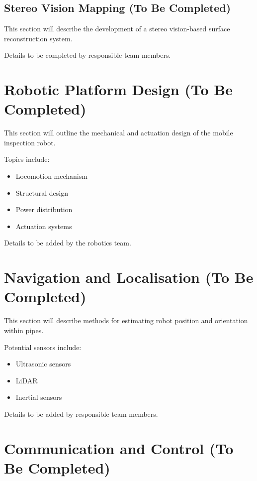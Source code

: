 \documentclass[11pt,a4paper]{article}
\begin{document}
\subsection{Stereo Vision Mapping (To Be Completed)}

This section will describe the development of a stereo vision-based surface reconstruction system.

Details to be completed by responsible team members.

\section{Robotic Platform Design (To Be Completed)}

This section will outline the mechanical and actuation design of the mobile inspection robot.

Topics include:

\begin{itemize}
  \item Locomotion mechanism
  \item Structural design
  \item Power distribution
  \item Actuation systems
\end{itemize}

Details to be added by the robotics team.

\section{Navigation and Localisation (To Be Completed)}

This section will describe methods for estimating robot position and orientation within pipes.

Potential sensors include:

\begin{itemize}
  \item Ultrasonic sensors
  \item LiDAR
  \item Inertial sensors
\end{itemize}

Details to be added by responsible team members.

\section{Communication and Control (To Be Completed)}
\end{document}
